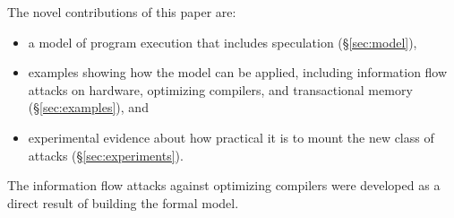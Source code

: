 The novel contributions of this paper are:
\begin{itemize}

\item a model of program execution that includes speculation (\S\ref{sec:model}),

\item examples showing how the model can be applied,
  including information flow attacks on
  hardware, optimizing compilers, and transactional memory (\S\ref{sec:examples}), and

\item experimental evidence about how practical it is to mount
  the new class of attacks (\S\ref{sec:experiments}).

\end{itemize}
The information flow attacks against optimizing compilers were developed
as a direct result of building the formal model.
